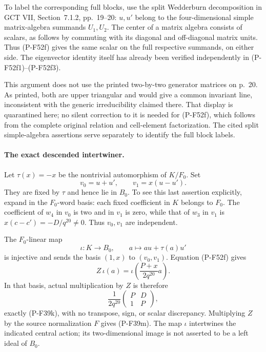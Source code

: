 \documentclass[11pt,a4paper]{article}
\begin{document}
To label the corresponding full blocks, use the split Wedderburn
decomposition in GCT VII, Section~7.1.2, pp.~19--20: $u,u'$
belong to the four-dimensional simple matrix-algebra summands
$U_1,U_2$. The center of a matrix algebra consists of scalars,
as follows by commuting with its diagonal and off-diagonal matrix
units. Thus (P-F52f) gives the same scalar on the full respective
summands, on either side. The eigenvector identity itself has
already been verified independently in (P-F52f1)--(P-F52f3).

This argument does not use the printed two-by-two generator
matrices on p.~20. As printed, both are upper triangular and
would give a common invariant line, inconsistent with the
generic irreducibility claimed there. That display is
quarantined here; no silent correction to it is needed for
(P-F52f), which follows from the complete original relation
and cell-element factorization. The cited split simple-algebra
assertions serve separately to identify the full block labels.

\paragraph{The exact descended intertwiner.}
Let $\tau(x)=-x$ be the nontrivial automorphism of $K/F_0$.
Set
\[
            v_0=u+u',\qquad v_1=x(u-u').                       \tag{P-F52g}
\]
They are fixed by $\tau$ and hence lie in $B_0$. To see this
last assertion explicitly, expand in the $F_0$-word basis:
each fixed coefficient in $K$ belongs to $F_0$.
The coefficient of $w_4$ in $v_0$ is two and in $v_1$ is zero,
while that of $w_3$ in $v_1$ is
$x(c-c')=-D/q^{20}\ne0$. Thus $v_0,v_1$ are independent.

The $F_0$-linear map
\[
       \iota:K\longrightarrow B_0,
           \qquad a\longmapsto au+\tau(a)u'                  \tag{P-F52h}
\]
is injective and sends the basis $(1,x)$ to $(v_0,v_1)$.
Equation (P-F52f) gives
\[
       Z\,\iota(a)=\iota\left(\frac{P+x}{2q^{20}}a\right).
                                                               \tag{P-F52i}
\]
In that basis, actual multiplication by $Z$ is therefore
\[
                 \frac1{2q^{20}}
                       \begin{pmatrix}P&D\\1&P\end{pmatrix}, \tag{P-F52j}
\]
exactly (P-F39k), with no transpose, sign, or scalar discrepancy.
Multiplying $Z$ by the source normalization $F$ gives (P-F39m).
The map $\iota$ intertwines the indicated central action; its
two-dimensional image is not asserted to be a left ideal of $B_0$.
\end{document}

